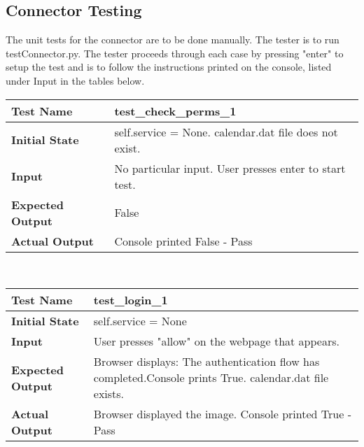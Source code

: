 \documentclass[12pt, titlepage]{article}
\begin{document}
	\subsection{Connector Testing}
	The unit tests for the connector are to be done manually. The tester is to run testConnector.py. 
	The tester proceeds through each case by pressing "enter" to setup the test	and is to follow the instructions printed on the console, listed under Input in the tables below. \newline
        \begin{table}[!htbp]
			\color{black}
        
            \hfill	%
            
			\begin{tabularx}{\textwidth}{|l|X|}%
				\hline
                \textbf{Test Name} & test\_check\_perms\_1
                \\\hline
                \textbf{Initial State} & self.service = None. calendar.dat file does not exist.
                \\\hline
                \textbf{Input} & No particular input. User presses enter to start test.
                \\\hline 
                \textbf{Expected Output} & False
                \\\hline
                \textbf{Actual Output} & Console printed False - Pass
                \\\hline
			\end{tabularx}\\ %
    	\end{table}			
			\hfill	%
		\begin{table}[!htbp]			
			\begin{tabularx}{\textwidth}{|l|X|}%
				\hline
                \textbf{Test Name} & test\_login\_1
                \\\hline
                \textbf{Initial State} & self.service = None
                \\\hline
                \textbf{Input} & User presses "allow" on the webpage that appears.
                \\\hline 
                \textbf{Expected Output} & Browser displays: The authentication flow has completed.\newline Console prints True. calendar.dat file exists.
                \\\hline
                \textbf{Actual Output} & Browser displayed the image. Console printed True - Pass
                \\\hline
            \end{tabularx}\\ %
    	\end{table}	
\end{document}
